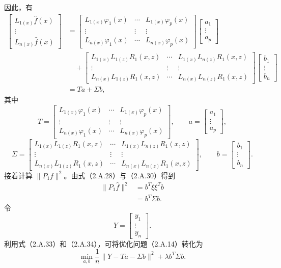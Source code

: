 因此，有
\providecommand{\chTwoT}{\begin{bmatrix}
L_{1(x)}\varphi_1(x)&\cdots&L_{1(x)}\varphi_p(x)\\
\vdots&\vdots&\vdots\\
L_{n(x)}\varphi_1(x)&\cdots&L_{n(x)}\varphi_p(x)
\end{bmatrix}}
\providecommand{\chTwoSigma}{\begin{bmatrix}
L_{1(x)}L_{1(z)}R_1(x,z)&\cdots&L_{1(x)}L_{n(z)}R_1(x,z)\\
\vdots&\vdots&\vdots\\
L_{n(x)}L_{1(z)}R_1(x,z)&\cdots&L_{n(x)}L_{n(z)}R_1(x,z)
\end{bmatrix}}
\providecommand{\chTwoAvec}{\begin{bmatrix}a_1\\\vdots\\a_p\end{bmatrix}}
\providecommand{\chTwoBvec}{\begin{bmatrix}b_1\\\vdots\\b_n\end{bmatrix}}
\begin{equation}
\begin{aligned}
\begin{bmatrix}L_{1(x)}\widehat f(x)\\\vdots\\L_{n(x)}\widehat f(x)\end{bmatrix}
 &=\chTwoT\chTwoAvec\\
 &\quad+\chTwoSigma\chTwoBvec\\
 &=Ta+\Sigma b,
\end{aligned}\tag{2.A.33}
\end{equation}
其中
\[
T=\chTwoT,\qquad a=\chTwoAvec,
\]
\[
\Sigma=\chTwoSigma,\qquad b=\chTwoBvec.
\]
接着计算 $\|P_1f\|^2$。由式（2.A.28）与（2.A.30）得到
\begin{equation}
\begin{aligned}
\|P_1\widehat f\|^2&=b^T\xi\xi^Tb\\
 &=b^T\Sigma b.
\end{aligned}\tag{2.A.34}
\end{equation}
令
\[
Y=\begin{bmatrix}y_1\\\vdots\\y_n\end{bmatrix}.
\]
利用式（2.A.33）和（2.A.34），可将优化问题（2.A.14）转化为
\begin{equation}
\min_{a,b}\frac1n\|Y-Ta-\Sigma b\|^2+\lambda b^T\Sigma b.\tag{2.A.35}
\end{equation}
